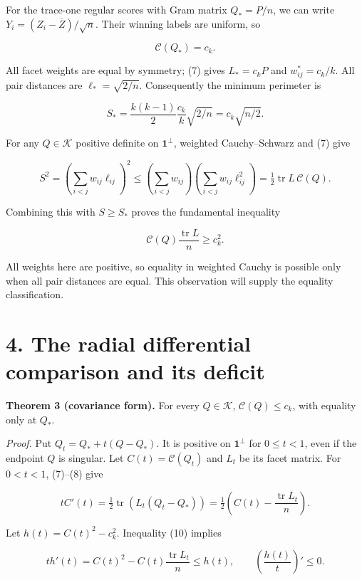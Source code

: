 \documentclass[
  11pt,
]{article}
\begin{document}
For the trace-one regular scores with Gram matrix \(Q_*=P/n\), we can
write \(Y_i=(Z_i-\overline Z)/\sqrt n\). Their winning labels are
uniform, so

\[
 \mathcal C(Q_*)=c_k.
\]

All facet weights are equal by symmetry; (7) gives \(L_*=c_kP\) and
\(w_{ij}^*=c_k/k\). All pair distances are \(\ell_* =\sqrt{2/n}\).
Consequently the minimum perimeter is

\[
 S_* =\frac{k(k-1)}2\frac{c_k}k\sqrt{2/n}
              =c_k\sqrt{n/2}.                            \tag{9}
\]

For any \(Q\in\mathcal K\) positive definite on \(\mathbf1^\perp\),
weighted Cauchy--Schwarz and (7) give

\[
 S^2=\left(\sum_{i<j}w_{ij}\ell_{ij}\right)^2
 \le\left(\sum_{i<j}w_{ij}\right)
        \left(\sum_{i<j}w_{ij}\ell_{ij}^2\right)
 =\tfrac12\operatorname{tr}L\,\mathcal C(Q).
\]

Combining this with \(S\ge S_*\) proves the fundamental inequality

\[
 \mathcal C(Q)\frac{\operatorname{tr}L}{n}\ge c_k^2.       \tag{10}
\]

All weights here are positive, so equality in weighted Cauchy is
possible only when all pair distances are equal. This observation will
supply the equality classification.

\section{4. The radial differential comparison and its
deficit}\label{the-radial-differential-comparison-and-its-deficit}

\textbf{Theorem 3 (covariance form).} For every \(Q\in\mathcal K\),
\(\mathcal C(Q)\le c_k\), with equality only at \(Q_*\).

\emph{Proof.} Put \(Q_t=Q_*+t(Q-Q_*)\). It is positive on
\(\mathbf1^\perp\) for \(0\le t<1\), even if the endpoint \(Q\) is
singular. Let \(C(t)=\mathcal C(Q_t)\) and \(L_t\) be its facet matrix.
For \(0<t<1\), (7)--(8) give

\[
 tC'(t)=\tfrac12\operatorname{tr}(L_t(Q_t-Q_*))
       =\tfrac12\left(C(t)-\frac{\operatorname{tr}L_t}{n}\right).
                                                               \tag{11}
\]

Let \(h(t)=C(t)^2-c_k^2\). Inequality (10) implies

\[
 th'(t)=C(t)^2-C(t)\frac{\operatorname{tr}L_t}{n}
       \le h(t),\qquad
 \left(\frac{h(t)}t\right)'\le0.                         \tag{12}
\]
\end{document}
